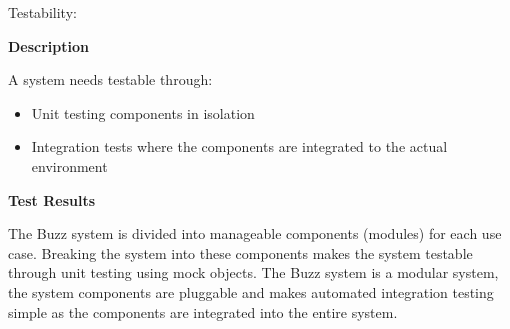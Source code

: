 \newpage
\item Testability:

\textbf{Description}

A system needs testable through:
\begin{itemize}
\item Unit testing components in isolation
\item Integration tests where the components are integrated to the actual environment
\end{itemize}

\textbf{Test Results}
   
The Buzz system is divided into manageable components (modules) for each use case. Breaking the system into these components makes the system testable through unit testing using mock objects. The Buzz system is a modular system, the system components are pluggable and makes automated integration testing simple as the components are integrated into the entire system.    